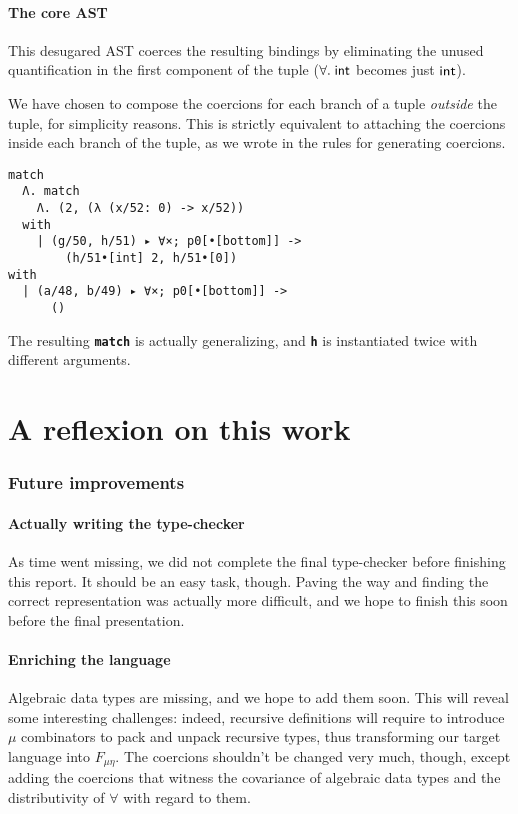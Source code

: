 \documentclass[10pt,a4paper,twoside,titlepage,twocolumn]{article}
\newcommand{\code}[1]{\textbf{\texttt{#1}}}
\begin{document}
\subsection{The core AST}

This desugared AST coerces the resulting bindings by eliminating the unused
quantification in the first component of the tuple ($\forall.\;\text{\textsf{int}}$ becomes
just $\text{\textsf{int}}$).

We have chosen to compose the coercions for each branch of a tuple
\emph{outside} the tuple, for simplicity reasons. This is strictly equivalent to
attaching the coercions inside each branch of the tuple, as we wrote in the
rules for generating coercions.

\begin{verbatim}
match
  Λ. match
    Λ. (2, (λ (x/52: 0) -> x/52))
  with
    | (g/50, h/51) ▸ ∀×; p0[•[bottom]] ->
        (h/51•[int] 2, h/51•[0])
with
  | (a/48, b/49) ▸ ∀×; p0[•[bottom]] ->
      ()
\end{verbatim}

The resulting \code{match} is actually generalizing, and \code{h} is
instantiated twice with different arguments.

\part{A reflexion on this work}

\section{Future improvements}

\subsection{Actually writing the type-checker}

As time went missing, we did not complete the final type-checker before
finishing this report. It should be an easy task, though. Paving the way and
finding the correct representation was actually more difficult, and we hope to
finish this soon before the final presentation.

\subsection{Enriching the language}

Algebraic data types are missing, and we hope to add them soon. This will reveal
some interesting challenges: indeed, recursive definitions will require to
introduce $\mu$ combinators to pack and unpack recursive types, thus
transforming our target language into $F_{\mu\eta}$. The coercions shouldn't be
changed very much, though, except adding the coercions that witness the
covariance of algebraic data types and the distributivity of $\forall$ with
regard to them.
\end{document}
